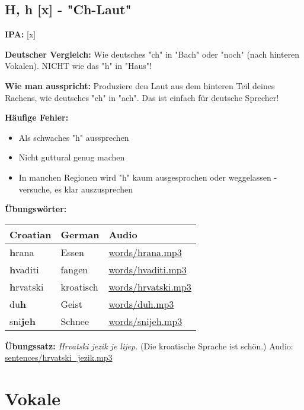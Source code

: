 \subsection{H, h [x] - "Ch-Laut"}

\begin{tcolorbox}[breakable, colback=lightyellow!30, colframe=orange, title=\textbf{H, h}]

\textbf{IPA:} [x]

\textbf{Deutscher Vergleich:}
Wie deutsches "ch" in "Bach" oder "noch" (nach hinteren Vokalen). NICHT wie das "h" in "Haus"!

\textbf{Wie man ausspricht:}
Produziere den Laut aus dem hinteren Teil deines Rachens, wie deutsches "ch" in "ach". Das ist einfach für deutsche Sprecher!

\textbf{Häufige Fehler:}
\begin{itemize}
    \item Als schwaches "h" aussprechen
    \item Nicht guttural genug machen
    \item In manchen Regionen wird "h" kaum ausgesprochen oder weggelassen - versuche, es klar auszusprechen
\end{itemize}

\textbf{Übungswörter:}
\begin{center}
\small
\begin{tabular}{lll}
\textbf{Croatian} & \textbf{German} & \textbf{Audio} \\
\midrule
\textbf{h}rana & Essen & \small\url{words/hrana.mp3} \\
\textbf{h}vaditi & fangen & \small\url{words/hvaditi.mp3} \\
\textbf{h}rvatski & kroatisch & \small\url{words/hrvatski.mp3} \\
du\textbf{h} & Geist & \small\url{words/duh.mp3} \\
sni\textbf{jeh} & Schnee & \small\url{words/snijeh.mp3} \\
\end{tabular}
\end{center}

\textbf{Übungssatz:}
\textit{Hrvatski jezik je lijep.}
(Die kroatische Sprache ist schön.)
Audio: \small\url{sentences/hrvatski\_jezik.mp3}

\end{tcolorbox}

\section{Vokale}

